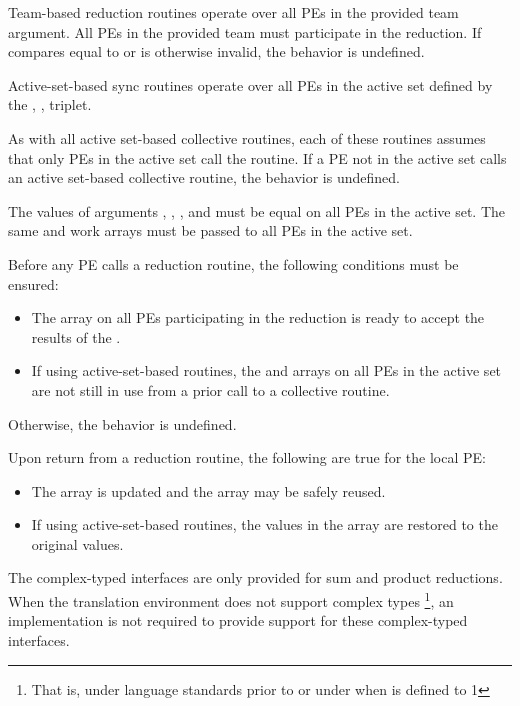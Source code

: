 \begin{apidefinition}
{    Team-based reduction routines operate over all \acp{PE} in the provided team argument. All
    \acp{PE} in the provided team must participate in the reduction.
    If  compares equal to  or is
    otherwise invalid, the behavior is undefined.

    Active-set-based sync routines operate over all \acp{PE} in the active set
    defined by the , ,  triplet.

    As with all active set-based collective routines,
    each of these routines assumes
    that only \acp{PE} in the active set call the routine.  If a \ac{PE} not in
    the active set calls an active set-based collective routine,
    the behavior is undefined.

    The values of arguments , , ,
    and  must be equal on all \acp{PE} in the active set.
    The same  and  work arrays must be passed to all
    \acp{PE} in the active set.

    Before any \ac{PE} calls a reduction routine, the following conditions must be ensured:
    \begin{itemize}
    \item The \dest{} array on all \acp{PE} participating in the reduction
      is ready to accept the results of the .
    \item If using active-set-based routines, the
       and  arrays on all \acp{PE} in the
      active set are not still in use from a prior call to a collective
      \openshmem routine.
    \end{itemize}
    Otherwise, the behavior is undefined.
    
    Upon return from a reduction routine, the following are true for the local
    \ac{PE}:
    \begin{itemize}
    \item The \dest{} array is updated and the \source{} array may be safely reused.
    \item If using active-set-based routines,
    the values in the  array are restored to the original values.
    \end{itemize}

    The complex-typed interfaces are only provided for sum and product reductions.
    When the \Cstd translation environment does not support complex types
    \footnote{That is, under \Cstd language standards prior to \Cstd[99] or under \Cstd[11]
    when  is defined to 1}, an \openshmem
    implementation is not required to provide support for these
    complex-typed interfaces.
}


\end{apidefinition}
